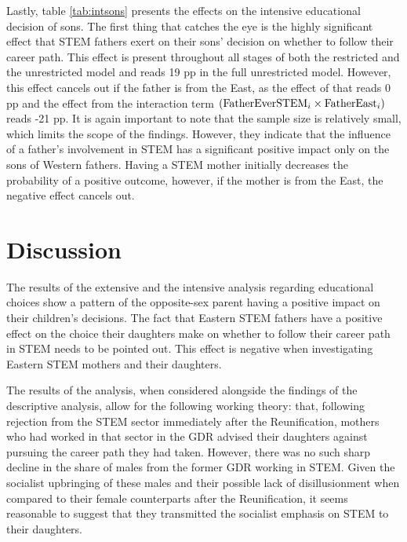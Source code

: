 \documentclass[a4paper, oneside, hyperfootnotes = false]{article}
\begin{document}
{Lastly, table \ref{tab:intsons} presents the effects on the intensive educational decision of sons.
The first thing that catches the eye is the highly significant effect that STEM fathers exert on their sons' decision on whether to follow their career path.
This effect is present throughout all stages of both the restricted and the unrestricted model and reads 19 pp in the full unrestricted model.
However, this effect cancels out if the father is from the East, as the effect of that reads 0 pp and the effect from the interaction term $(\textnormal{FatherEverSTEM}_{i} \times \textnormal{FatherEast}_{i})$  reads -21 pp.
It is again important to note that the sample size is relatively small, which limits the scope of the findings.
However, they indicate that the influence of a father's involvement in STEM has a significant positive impact only on the sons of Western fathers.
Having a STEM mother initially decreases the probability of a positive outcome, however, if the mother is from the East, the negative effect cancels out.

\section{Discussion}
\label{discussion}

The results of the extensive and the intensive analysis regarding educational choices show a pattern of the opposite-sex parent having a positive impact on their children's decisions.
The fact that Eastern STEM fathers have a positive effect on the choice their daughters make on whether to follow their career path in STEM needs to be pointed out.
This effect is negative when investigating Eastern STEM mothers and their daughters.

The results of the analysis, when considered alongside the findings of the descriptive analysis, allow for the following working theory:
that, following rejection from the STEM sector immediately after the Reunification, mothers who had worked in that sector in the GDR advised their daughters against pursuing the career path they had taken.
However, there was no such sharp decline in the share of males from the former GDR working in STEM.
Given the socialist upbringing of these males and their possible lack of disillusionment when compared to their female counterparts after the Reunification, it seems reasonable to suggest that they transmitted the socialist emphasis on STEM to their daughters.

}
\end{document}
